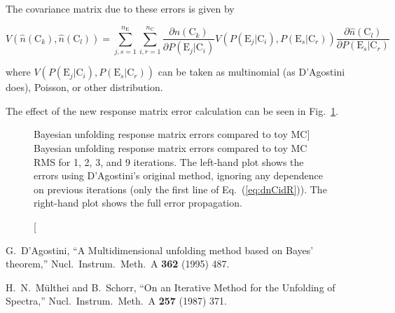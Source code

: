 \documentclass[12pt,a4paper]{article}
\newcommand{\E}{\mathrm{E}}
\newcommand{\C}{\mathrm{C}}
\newcommand{\dd}[2]{\frac{\partial{#1}}{\partial{#2}}}
\begin{document}
The covariance matrix due to these errors is given by

\begin{equation}
V(\hat{n}(\C_k),\hat{n}(\C_l)) = \sum_{j,s=1}^{n_{\E}} \sum_{i,r=1}^{n_{\C}} \dd{\hat{n}(\C_k)}{P(\E_j|\C_i)} V(P(\E_j|\C_i),P(\E_s|\C_r)) \dd{\hat{n}(\C_l)}{P(\E_s|\C_r)}
\end{equation}

where $V(P(\E_j|\C_i),P(\E_s|\C_r))$ can be taken as multinomial (as D'Agostini does), Poisson, or other distribution.

The effect of the new response matrix error calculation can be seen in Fig.~\ref{fig:bayes_errors_sys}.%
\begin{figure}[ht]
%
\caption
[Bayesian unfolding response matrix errors compared to toy MC]%
{Bayesian unfolding response matrix errors compared to toy MC RMS for 1, 2, 3, and 9 iterations.
The left-hand plot shows the errors using D'Agostini's original method,
ignoring any dependence on previous iterations (only the first line of Eq.~(\ref{eq:dnCidR})).
The right-hand plot shows the full error propagation.}%
\label{fig:bayes_errors_sys}%
\end{figure}


\begin{thebibliography}{99}

  G.~D'Agostini,
  ``A Multidimensional unfolding method based on Bayes' theorem,''
  Nucl.\ Instrum.\ Meth.\  A {\bf 362} (1995) 487.

  H.~N.~M\"ulthei and B.~Schorr,
  ``On an Iterative Method for the Unfolding of Spectra,''
  Nucl.\ Instrum.\ Meth.\  A {\bf 257} (1987) 371.

\end{thebibliography}
\end{document}
